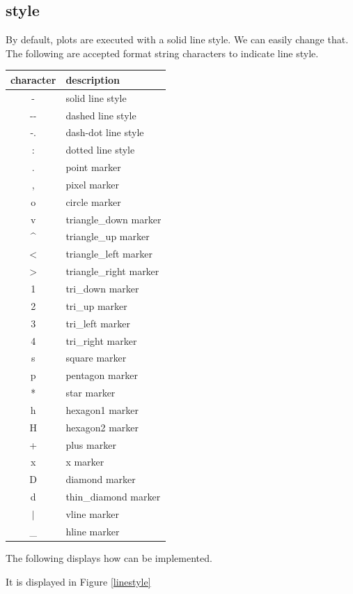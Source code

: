 \subsection*{style}
By default, plots are executed with a solid line style. We can easily change that. The following are accepted format string characters to indicate line style. 

\begin{tabular}
{|c||l|}
\hline
character & description \\
\hline
- & solid line style \\
-{}- & dashed line style\\
-. & dash-dot line style \\
: & dotted line style \\
. & point marker \\
, & pixel marker \\
o & circle marker \\
v & triangle\_down marker \\
\^{} & triangle\_up marker \\
$<$ & triangle\_left marker \\
$>$ & triangle\_right marker \\
1 & tri\_down marker \\
2 & tri\_up marker \\
3 & tri\_left marker \\
4 & tri\_right marker \\
s & square marker \\
p & pentagon marker \\
* & star marker \\
h & hexagon1 marker \\
H & hexagon2 marker \\
+ & plus marker \\
x & x marker \\
D & diamond marker \\
d & thin\_diamond marker \\
$|$ & vline marker \\
\_{} & hline marker \\
\hline 
\end{tabular}


The following displays how  can be  implemented. 

It is displayed in Figure \ref{linestyle}


